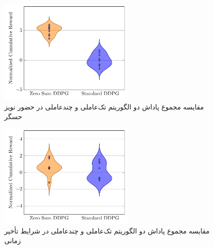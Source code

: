 \begin{figure}[H]
	\centering
	\includegraphics[width=0.6\textwidth]{plots/ddpg/violin_plot/sensor_noise}
	\caption{مقایسه مجموع پاداش دو الگوریتم تک‌عاملی و چندعاملی  در حضور نویز حسگر}
\end{figure}

\begin{figure}[H]
	\centering
	\includegraphics[width=0.6\textwidth]{plots/ddpg/violin_plot/time_delay}
	\caption{مقایسه مجموع پاداش دو الگوریتم تک‌عاملی و چندعاملی  در شرایط تأخیر زمانی}
\end{figure}



